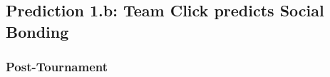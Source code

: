\begin{CJK}{UTF8}{gbsn}



  \subsection{Prediction 1.b: Team Click predicts Social Bonding \label{app8:prediction1b}}

       \subsubsection{Post-Tournament\label{app8:prediction1bPost}}




        


\end{CJK}
